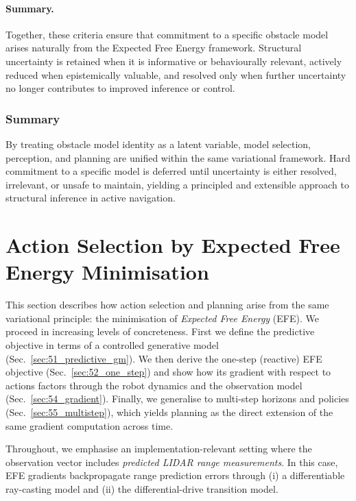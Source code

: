 \documentclass[a4paper, twoside]{article}
\begin{document}
\paragraph{Summary.}
Together, these criteria ensure that commitment to a specific obstacle model arises
naturally from the Expected Free Energy framework.
Structural uncertainty is retained when it is informative or behaviourally relevant,
actively reduced when epistemically valuable, and resolved only when further uncertainty
no longer contributes to improved inference or control.


\subsubsection{Summary}

By treating obstacle model identity as a latent variable, model selection,
perception, and planning are unified within the same variational framework.
Hard commitment to a specific model is deferred until uncertainty is either resolved,
irrelevant, or unsafe to maintain, yielding a principled and extensible approach
to structural inference in active navigation.





\section{Action Selection by Expected Free Energy Minimisation}
\label{sec:efe_control}

This section describes how action selection and planning arise from the same variational principle: the minimisation of \emph{Expected Free Energy} (EFE). We proceed in increasing levels of concreteness. First we define the predictive objective in terms of a controlled generative model (Sec.~\ref{sec:51_predictive_gm}). We then derive the one-step (reactive) EFE objective (Sec.~\ref{sec:52_one_step}) and show how its gradient with respect to actions factors through the robot dynamics and the observation model (Sec.~\ref{sec:54_gradient}). Finally, we generalise to multi-step horizons and policies (Sec.~\ref{sec:55_multistep}), which yields planning as the direct extension of the same gradient computation across time.

Throughout, we emphasise an implementation-relevant setting where the observation vector includes \emph{predicted LIDAR range measurements}. In this case, EFE gradients backpropagate range prediction errors through (i) a differentiable ray-casting model and (ii) the differential-drive transition model.
\end{document}
